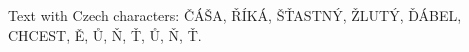 \documentclass{article}
\begin{document}
Text with Czech characters: ČÁŠA, ŘÍKÁ, ŠŤASTNÝ, ŽLUTÝ, ĎÁBEL, CHCEST, Ě, Ů, Ň, Ť, Ů, Ň, Ť.
\end{document}
